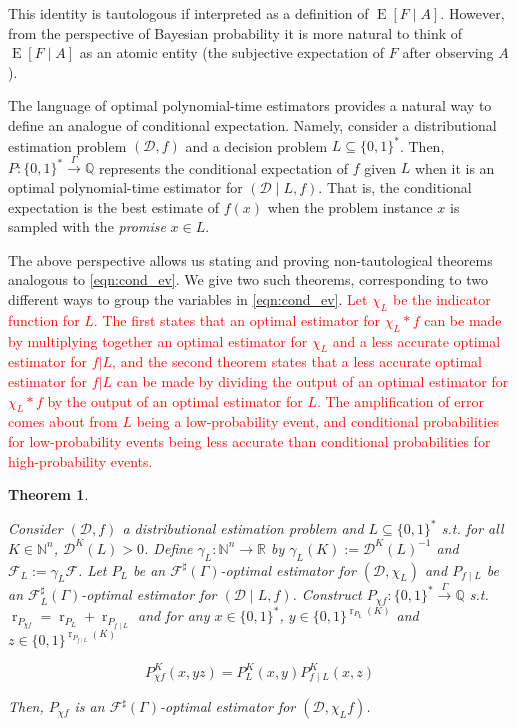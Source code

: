 \documentclass[11pt]{article}
\numberwithin{equation}{section}
\theoremstyle{definition}
\theoremstyle{plain}
\newtheorem{theorem}{Theorem}[section]
\newcommand{\Bool}{\{0,1\}}
\newcommand{\Words}{{\Bool^*}}
\DeclareMathOperator{\E}{E}
\DeclareMathOperator{\R}{r}
\newcommand{\Nats}{\mathbb{N}}
\newcommand{\Rats}{\mathbb{Q}}
\newcommand{\Reals}{\mathbb{R}}
\newcommand{\NatFun}{\Nats^n \rightarrow}
\newcommand{\Dist}{\mathcal{D}}
\newcommand{\Fall}{\mathcal{F}}
\newcommand{\ESG}{\Fall^\sharp(\Gamma)}
\newcommand{\BoolR}[1]{\Bool^{\R_{#1}(K)}}
\newcommand{\Scheme}{\xrightarrow{\Gamma}}
\begin{document}
This identity is tautologous if interpreted as a definition of $\E[F \mid A]$. However, from the perspective of Bayesian probability it is more natural to think of $\E[F \mid A]$ as an atomic entity (the subjective expectation of $F$ after observing $A$). 

The language of optimal polynomial-time estimators provides a natural way to define an analogue of conditional expectation. Namely, consider a distributional estimation problem $(\Dist, f)$ and a decision problem ${L \subseteq \Words}$. Then, $P: \Words \Scheme \Rats$ represents the conditional expectation of $f$ given $L$ when it is an optimal polynomial-time estimator for $(\Dist \mid L, f)$. That is, the conditional expectation is the best estimate of $f(x)$ when the problem instance $x$ is sampled with the \emph{promise} $x \in L$.

The above perspective allows us stating and proving non-tautological theorems analogous to \ref{eqn:cond_ev}. We give two such theorems, corresponding to two different ways to group the variables in \ref{eqn:cond_ev}. \textcolor{red}{Let $\chi_{L}$ be the indicator function for $L$. The first states that an optimal estimator for $\chi_{L}*f$ can be made by multiplying together an optimal estimator for $\chi_{L}$ and a less accurate optimal estimator for $f|L$, and the second theorem states that a less accurate optimal estimator for $f|L$ can be made by dividing the output of an optimal estimator for $\chi_{L}*f$ by the output of an optimal estimator for $L$. The amplification of error comes about from $L$ being a low-probability event, and conditional probabilities for low-probability events being less accurate than conditional probabilities for high-probability events.}

\begin{samepage}
\begin{theorem}
\label{thm:con_cond}

Consider $(\Dist, f)$ a distributional estimation problem and ${L \subseteq \Words}$ s.t. for all $K \in \Nats^n$, $\Dist^K(L) > 0$. Define $\gamma_L: \NatFun \Reals$ by $\gamma_L(K):=\Dist^{K}(L)^{-1}$ and $\Fall_L:=\gamma_L \Fall$. Let $P_L$ be an $\ESG$-optimal estimator for $(\Dist, \chi_L)$ and $P_{f \mid L}$ be an $\Fall_L^\sharp(\Gamma)$-optimal estimator for ${(\Dist \mid L, f)}$. Construct ${P_{\chi f}: \Words \Scheme \Rats}$ s.t. $\R_{P_{\chi f}}=\R_{P_L} + \R_{P_{f \mid L}}$ and for any ${x \in \Words}$, $y \in \BoolR{P_L}$ and ${z \in \BoolR{P_{f \mid L}}}$

\begin{equation}
P_{\chi f}^K(x,yz)=P_L^K(x,y) P_{f \mid L}^K(x,z)
\end{equation}

Then, $P_{\chi f}$ is an $\ESG$-optimal estimator for $(\Dist, \chi_L f)$.

\end{theorem}
\end{samepage}
\end{document}
